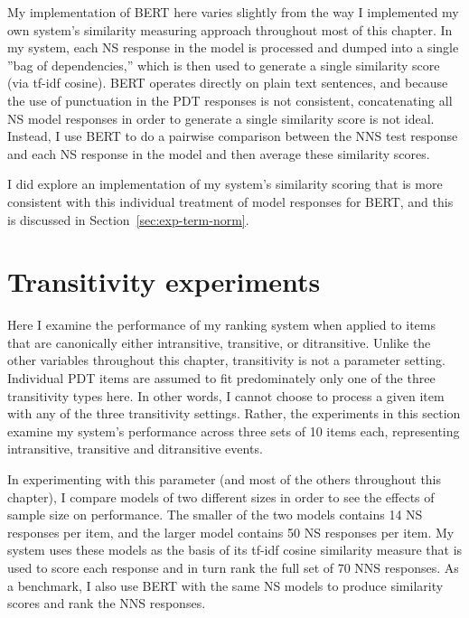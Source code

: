 My implementation of BERT here varies slightly from the way I implemented my own system's similarity measuring approach throughout most of this chapter. In my system, each NS response in the model is processed and dumped into a single ''bag of dependencies,'' which is then used to generate a single similarity score (via tf-idf cosine). BERT operates directly on plain text sentences, and because the use of punctuation in the PDT responses is not consistent, concatenating all NS model responses in order to generate a single similarity score is not ideal. Instead, I use BERT to do a pairwise comparison between the NNS test response and each NS response in the model and then average these similarity scores.

I did explore an implementation of my system's similarity scoring that is more consistent with this individual treatment of model responses for BERT, and this is discussed in Section~\ref{sec:exp-term-norm}.


\section{Transitivity experiments}
\label{sec:exp-transitivity}
Here I examine the performance of my ranking system when applied to items that are canonically either intransitive, transitive, or ditransitive. Unlike the other variables throughout this chapter, transitivity is not a parameter setting. Individual PDT items are assumed to fit predominately only one of the three transitivity types here. In other words, I cannot choose to process a given item with any of the three transitivity settings. Rather, the experiments in this section examine my system's performance across three sets of 10 items each, representing intransitive, transitive and ditransitive events.

In experimenting with this parameter (and most of the others throughout this chapter), I compare models of two different sizes in order to see the effects of sample size on performance. The smaller of the two models contains 14 NS responses per item, and the larger model contains 50 NS responses per item. My system uses these models as the basis of its tf-idf cosine similarity measure that is used to score each response and in turn rank the full set of 70 NNS responses. As a benchmark, I also use BERT with the same NS models to produce similarity scores and rank the NNS responses.

